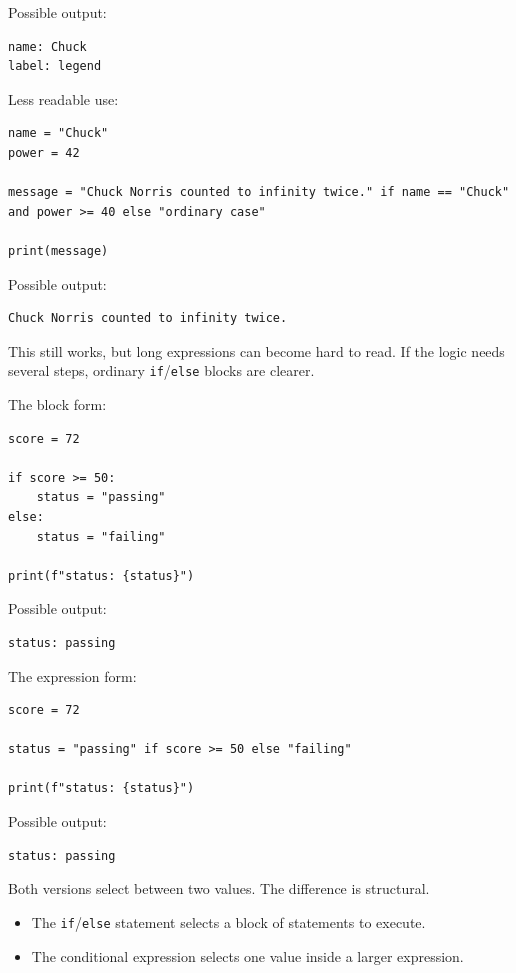\documentclass[a4paper,twoside]{report}
\begin{document}
Possible output:

\begin{verbatim}
name: Chuck
label: legend
\end{verbatim}

Less readable use:

\begin{verbatim}
name = "Chuck"
power = 42

message = "Chuck Norris counted to infinity twice." if name == "Chuck" and power >= 40 else "ordinary case"

print(message)
\end{verbatim}

Possible output:

\begin{verbatim}
Chuck Norris counted to infinity twice.
\end{verbatim}

This still works, but long expressions can become hard to read. If the logic needs several steps, ordinary \texttt{if}/\texttt{else} blocks are clearer.

The block form:

\begin{verbatim}
score = 72

if score >= 50:
    status = "passing"
else:
    status = "failing"

print(f"status: {status}")
\end{verbatim}

Possible output:

\begin{verbatim}
status: passing
\end{verbatim}

The expression form:

\begin{verbatim}
score = 72

status = "passing" if score >= 50 else "failing"

print(f"status: {status}")
\end{verbatim}

Possible output:

\begin{verbatim}
status: passing
\end{verbatim}

Both versions select between two values. The difference is structural.

\begin{itemize}
    \item The \texttt{if}/\texttt{else} statement selects a block of statements to execute.
    \item The conditional expression selects one value inside a larger expression.
\end{itemize}
\end{document}

